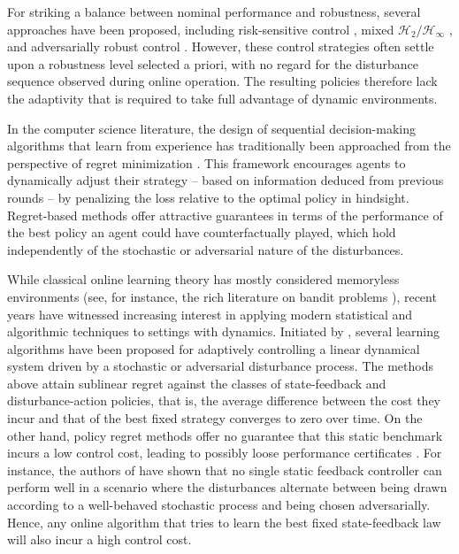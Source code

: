 \documentclass[conference]{IEEEtran}
\begin{document}
For striking a balance between nominal performance and robustness, several approaches have been proposed, including risk-sensitive control \cite{jacobson1973optimal}, mixed $\mathcal{H}_2 {/} \mathcal{H}_\infty$ \cite{bernstein1988lqg, doyle1989optimal, rotea1991h2, scherer1995mixed}, and adversarially robust control \cite{lee2022performance}. However, these control strategies often settle upon a robustness level selected a priori, with no regard for the disturbance sequence observed during online operation. The resulting policies therefore lack the adaptivity that is required to take full advantage of dynamic environments.

In the computer science literature, the design of sequential decision-making algorithms that learn from experience has traditionally been approached from the perspective of regret minimization \cite{shalev2011online, hazan2016introduction}. This framework encourages agents to dynamically adjust their strategy – based on information deduced from previous rounds – by penalizing the loss relative to the optimal policy in hindsight. Regret-based methods offer attractive guarantees in terms of the performance of the best policy an agent could have counterfactually played, which hold independently of the stochastic or adversarial nature of the disturbances.

While classical online learning theory has mostly considered memoryless environments (see, for instance, the rich literature on bandit problems \cite{lattimore2020bandit}), recent years have witnessed increasing interest in applying modern statistical and algorithmic techniques to settings with dynamics. Initiated by \cite{abbasi2011regret}, several learning algorithms have been proposed for adaptively controlling a linear dynamical system driven by a stochastic \cite{dean2018regret, cohen2019learning, lale2020logarithmic} or adversarial \cite{agarwal2019online, foster2020logarithmic, hazan2020nonstochastic, simchowitz2020improper} disturbance process. The methods above attain sublinear regret against the classes of state-feedback and disturbance-action policies, that is, the average difference between the cost they incur and that of the best fixed strategy converges to zero over time.
On the other hand, policy regret methods offer no guarantee that this static benchmark incurs a low control cost, leading to possibly loose performance certificates \cite{hazan2009efficient}. For instance, the authors of \cite{goel2023regret} have shown that no single static feedback controller can perform well in a scenario where the disturbances alternate between being drawn according to a well-behaved stochastic process and being chosen adversarially. Hence, any online algorithm that tries to learn the best fixed state-feedback law will also incur a high control cost.
\end{document}
